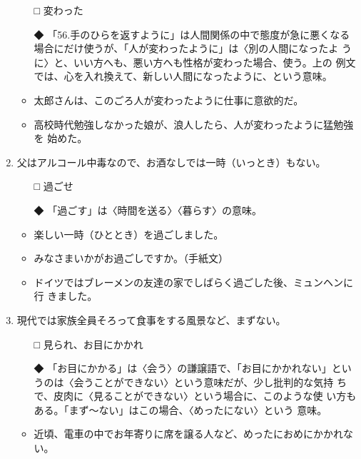 \documentclass[
uplatex,
b5paper,
10pt,
dvipdfmx
]{jsbook}
\begin{document}
\begin{enumerate}
\begin{itemize}
\item[□] 変わった
\item[◆] 「56.手のひらを返すように」は人間関係の中で態度が急に悪くなる
	  場合にだけ使うが、「人が変わったように」は〈別の人間になったよ
	  うに〉と、いい方へも、悪い方へも性格が変わった場合、使う。上の
	  例文では、心を入れ換えて、新しい人間になったように、という意味。
\end{itemize}
\begin{itemize}
\item 太郎さんは、このごろ人が変わったように仕事に意欲的だ。
\item 高校時代勉強しなかった娘が、浪人したら、人が変わったように猛勉強を
      始めた。
\end{itemize}
  

\item 父はアルコール中毒なので、お酒なしでは一時（いっとき）も\underline{\hspace{3zw}}ない。

\begin{itemize}
\item[□] 過ごせ
\item[◆] 「過ごす」は〈時間を送る〉〈暮らす〉の意味。
\end{itemize}
\begin{itemize}
\item 楽しい一時（ひととき）を過ごしました。
\item みなさまいかがお過ごしですか。（手紙文）
\item ドイツではブレーメンの友達の家でしばらく過ごした後、ミュンヘンに行
      きました。
\end{itemize}


\item 現代では家族全員そろって食事をする風景など、まず\underline{\hspace{3zw}}ない。

\begin{itemize}
\item[□] 見られ、お目にかかれ
\item[◆] 「お目にかかる」は〈会う〉の謙譲語で、「お目にかかれない」とい
	   うのは〈会うことができない〉という意味だが、少し批判的な気持
	   ちで、皮肉に〈見ることができない〉という場合に、このような使
	   い方もある。「まず〜ない」はこの場合、〈めったにない〉という
	   意味。
\end{itemize}
\begin{itemize}
\item 近頃、電車の中でお年寄りに席を譲る人など、めったにおめにかかれない。
\end{itemize}


\end{enumerate}
\end{document}
